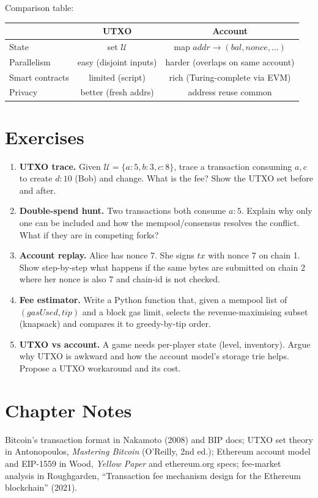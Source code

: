 Comparison table:

\begin{center}\small
\begin{tabular}{lcc}
\toprule
 & UTXO & Account \\
\midrule
State & set $\mathcal{U}$ & map $addr\to(bal,nonce,\dots)$ \\
Parallelism & easy (disjoint inputs) & harder (overlaps on same account)\\
Smart contracts & limited (script) & rich (Turing-complete via EVM)\\
Privacy & better (fresh addrs) & address reuse common\\
\bottomrule
\end{tabular}
\end{center}

\section{Exercises}\label{sec:ch03-exercises}
\begin{enumerate}[label=E3.\arabic*, leftmargin=*, itemsep=0.6em]
    \item \textbf{UTXO trace.} Given $\mathcal{U}=\{a{:}5,b{:}3,c{:}8\}$, trace a transaction consuming $a,c$ to create $d{:}10$ (Bob) and change. What is the fee? Show the UTXO set before and after.
    \item \textbf{Double-spend hunt.} Two transactions both consume $a{:}5$. Explain why only one can be included and how the mempool/consensus resolves the conflict. What if they are in competing forks?
    \item \textbf{Account replay.} Alice has nonce 7. She signs $tx$ with nonce 7 on chain 1. Show step-by-step what happens if the same bytes are submitted on chain 2 where her nonce is also 7 and chain-id is not checked.
    \item \textbf{Fee estimator.} Write a Python function that, given a mempool list of $(gasUsed, tip)$ and a block gas limit, selects the revenue-maximising subset (knapsack) and compares it to greedy-by-tip order.
    \item \textbf{UTXO vs account.} A game needs per-player state (level, inventory). Argue why UTXO is awkward and how the account model's storage trie helps. Propose a UTXO workaround and its cost.
\end{enumerate}

\section*{Chapter Notes}
Bitcoin's transaction format in Nakamoto (2008) and BIP docs; UTXO set theory in Antonopoulos, \emph{Mastering Bitcoin} (O'Reilly, 2nd ed.); Ethereum account model and EIP-1559 in Wood, \emph{Yellow Paper} and ethereum.org specs; fee-market analysis in Roughgarden, ``Transaction fee mechanism design for the Ethereum blockchain'' (2021).
